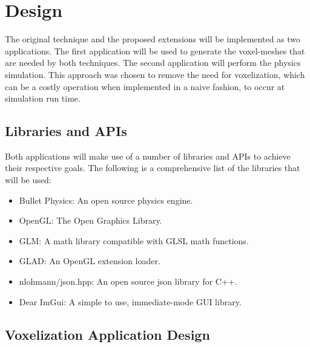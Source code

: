 \chapter{Design}


The original technique and the proposed extensions will be implemented as two applications. The 
first application will be used to generate the voxel-meshes that are needed by both techniques. The
second application will perform the physics simulation. This approach was chosen to remove the need
for voxelization, which can be a costly operation when implemented in a naive fashion, to occur at
simulation run time.

\section{Libraries and APIs}

Both applications will make use of a number of libraries and APIs to achieve their respective goals. 
The following is a comprehensive list of the libraries that will be used:

\begin{itemize}
  \item Bullet Physics: An open source physics engine.
  \item OpenGL: The Open Graphics Library.
  \item GLM: A math library compatible with GLSL math functions.
  \item GLAD: An OpenGL extension loader.
  \item nlohmann/json.hpp: An open source json library for C++.
  \item Dear ImGui: A simple to use, immediate-mode GUI library.
\end{itemize}

\section{Voxelization Application Design}

